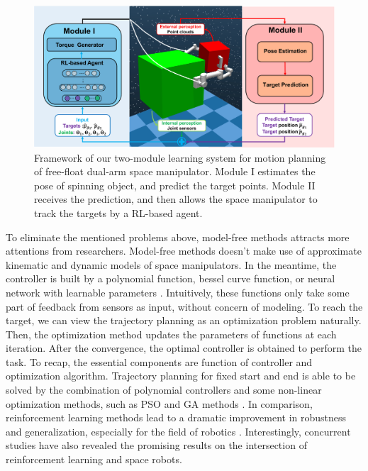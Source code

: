 \documentclass{article}
\begin{document}
\begin{figure}[t]
  \centering
  \includegraphics[width=\hsize]{figs/Fig1.pdf}
  \caption{Framework of our two-module learning system for motion planning of free-float dual-arm space manipulator. Module I estimates the pose of spinning object, and predict the target points. Module II receives the prediction, and then allows the space manipulator to track the targets by a RL-based agent.}
  \label{fig1}
\end{figure} 



To eliminate the mentioned problems above, model-free methods attracts more attentions from researchers. Model-free methods doesn't make use of approximate kinematic and dynamic models of space manipulators. In the meantime, the controller is built by a polynomial function, bessel curve function, or neural network with learnable parameters \cite{WANG20181525}. Intuitively, these functions only take some part of feedback from sensors as input, without concern of modeling. To reach the target, we can view the trajectory planning as an optimization problem naturally. Then, the optimization method updates the parameters of functions at each iteration. After the convergence, the optimal controller is obtained to perform the task. To recap, the essential components are function of controller and optimization algorithm. Trajectory planning for fixed start and end is able to be solved by the combination of polynomial controllers and some non-linear optimization methods, such as PSO and GA methods \cite{wang2015trajectory,chen2017path,WANG20181525}. In comparison, reinforcement learning methods lead to a dramatic improvement in robustness and generalization, especially for the field of robotics \cite{lee2020learning,chen2022system,yu2020meta,zhong2021collision,yamada2020motion,sang2020SelfConfiguring}. Interestingly, concurrent studies have also revealed the promising results on the intersection of reinforcement learning and space robots. 
\end{document}
